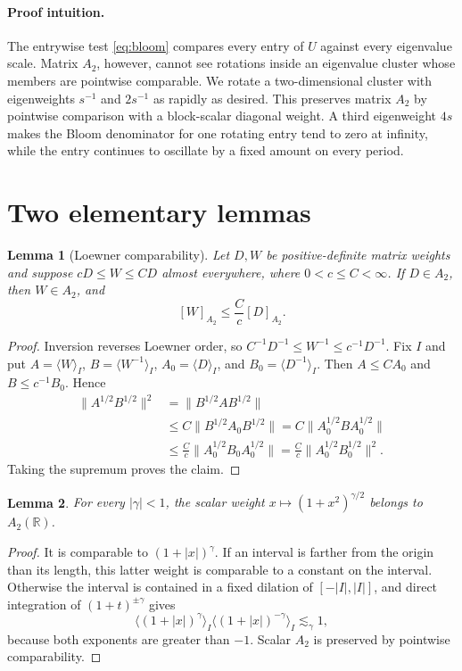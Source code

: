 \documentclass[10pt]{article}
\newtheorem{lemma}{Lemma}
\newcommand{\R}{\mathbb R}
\begin{document}
\paragraph{Proof intuition.}
The entrywise test \eqref{eq:bloom} compares every entry of $U$ against every
eigenvalue scale.  Matrix $A_2$, however, cannot see rotations inside an
eigenvalue cluster whose members are pointwise comparable.  We rotate a
two-dimensional cluster with eigenweights $s^{-1}$ and $2s^{-1}$ as rapidly
as desired.  This preserves matrix $A_2$ by pointwise comparison with a
block-scalar diagonal weight.  A third eigenweight $4s$ makes the Bloom
denominator for one rotating entry tend to zero at infinity, while the entry
continues to oscillate by a fixed amount on every period.

\section{Two elementary lemmas}

\begin{lemma}[Loewner comparability]\label{lem:compare}
Let $D,W$ be positive-definite matrix weights and suppose
$cD\le W\le CD$ almost everywhere, where $0<c\le C<\infty$.  If
$D\in A_2$, then $W\in A_2$, and
\[
 [W]_{A_2}\le \frac Cc[D]_{A_2}.
\]
\end{lemma}

\begin{proof}
Inversion reverses Loewner order, so
$C^{-1}D^{-1}\le W^{-1}\le c^{-1}D^{-1}$.  Fix $I$ and put
$A=\langle W\rangle_I$, $B=\langle W^{-1}\rangle_I$,
$A_0=\langle D\rangle_I$, and $B_0=\langle D^{-1}\rangle_I$.  Then
$A\le CA_0$ and $B\le c^{-1}B_0$.  Hence
\begin{align*}
 \|A^{1/2}B^{1/2}\|^2
 &=\|B^{1/2}AB^{1/2}\|\\
 &\le C\|B^{1/2}A_0B^{1/2}\|
 =C\|A_0^{1/2}BA_0^{1/2}\|\\
 &\le \frac Cc\|A_0^{1/2}B_0A_0^{1/2}\|
 =\frac Cc\|A_0^{1/2}B_0^{1/2}\|^2.
\end{align*}
Taking the supremum proves the claim.
\end{proof}

\begin{lemma}\label{lem:scalar}
For every $|\gamma|<1$, the scalar weight
$x\mapsto(1+x^2)^{\gamma/2}$ belongs to $A_2(\R)$.
\end{lemma}

\begin{proof}
It is comparable to $(1+|x|)^\gamma$.  If an interval is farther from the
origin than its length, this latter weight is comparable to a constant on the
interval.  Otherwise the interval is contained in a fixed dilation of
$[-|I|,|I|]$, and direct integration of $(1+t)^{\pm\gamma}$ gives
\[
 \langle(1+|x|)^\gamma\rangle_I
 \langle(1+|x|)^{-\gamma}\rangle_I\lesssim_\gamma1,
\]
because both exponents are greater than $-1$.  Scalar $A_2$ is preserved by
pointwise comparability.
\end{proof}
\end{document}
